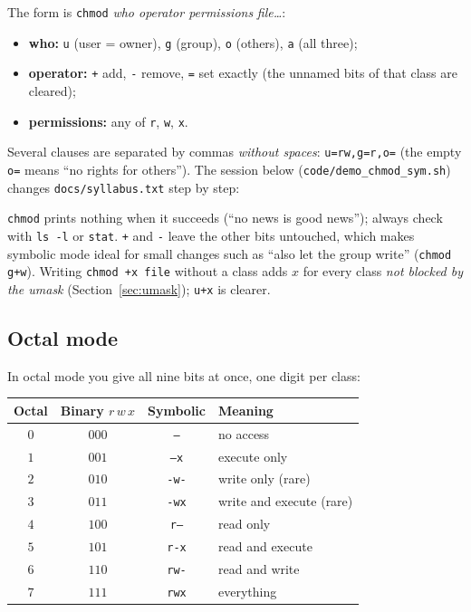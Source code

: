 \documentclass[11pt,a4paper]{article}
\newcommand{\cmd}[1]{\texttt{#1}}
\begin{document}
The form is \texttt{chmod} \emph{who operator permissions} \emph{file\dots}:
\begin{itemize}
  \item \textbf{who:} \texttt{u} (user = owner), \texttt{g} (group), \texttt{o} (others), \texttt{a} (all three);
  \item \textbf{operator:} \texttt{+} add, \texttt{-} remove, \texttt{=} set exactly (the unnamed bits of that class are cleared);
  \item \textbf{permissions:} any of \texttt{r}, \texttt{w}, \texttt{x}.
\end{itemize}
Several clauses are separated by commas \emph{without spaces}: \texttt{u=rw,g=r,o=} (the empty \texttt{o=} means ``no rights for others''). The session below (\cmd{code/demo\_chmod\_sym.sh}) changes \texttt{docs/syllabus.txt} step by step:



\cmd{chmod} prints nothing when it succeeds (``no news is good news''); always check with \cmd{ls -l} or \cmd{stat}. \texttt{+} and \texttt{-} leave the other bits untouched, which makes symbolic mode ideal for small changes such as ``also let the group write'' (\texttt{chmod g+w}). Writing \cmd{chmod +x file} without a class adds $x$ for every class \emph{not blocked by the umask} (Section~\ref{sec:umask}); \texttt{u+x} is clearer.

\subsection{Octal mode}

In octal mode you give all nine bits at once, one digit per class:

\begin{center}
\small
\begin{tabular}{@{}c c c l@{}}
\toprule
\textbf{Octal} & \textbf{Binary} $r\,w\,x$ & \textbf{Symbolic} & \textbf{Meaning} \\
\midrule
$0$ & $000$ & \texttt{---} & no access \\
$1$ & $001$ & \texttt{--x} & execute only \\
$2$ & $010$ & \texttt{-w-} & write only (rare) \\
$3$ & $011$ & \texttt{-wx} & write and execute (rare) \\
$4$ & $100$ & \texttt{r--} & read only \\
$5$ & $101$ & \texttt{r-x} & read and execute \\
$6$ & $110$ & \texttt{rw-} & read and write \\
$7$ & $111$ & \texttt{rwx} & everything \\
\bottomrule
\end{tabular}
\end{center}
\end{document}
